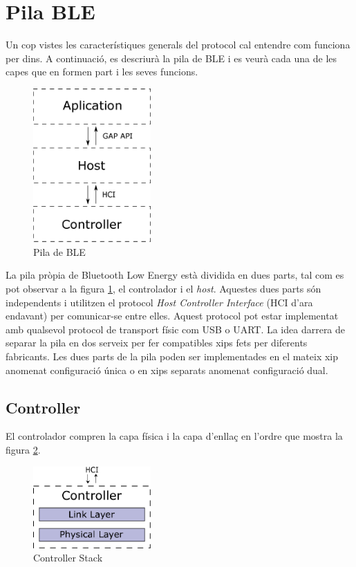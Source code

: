 \section{Pila BLE}
Un cop vistes les característiques generals del protocol cal entendre com funciona per dins.
A continuació, es descriurà la pila de BLE i es veurà cada una de les capes que en formen part i les seves funcions.

\begin{figure}[h!]
	\begin{center}
		\includegraphics[width=0.4\textwidth]{./diagrames/BLE_Stack_Simplified}
		\caption{Pila de BLE}
		\label{ble_stack}
	\end{center}
\end{figure}

La pila pròpia de Bluetooth Low Energy està dividida en dues parts, tal com es pot observar a la figura \ref{ble_stack}, el controlador i el \textit{host}. Aquestes dues parts són independents i utilitzen el protocol \textit{Host Controller Interface} (HCI d'ara endavant) per comunicar-se entre elles.
Aquest protocol pot estar implementat amb qualsevol protocol de transport físic com USB o UART.
La idea darrera de separar la pila en dos serveix per fer compatibles xips fets per diferents fabricants.
Les dues parts de la pila poden ser implementades en el mateix xip anomenat configuració única o en xips separats anomenat configuració dual.


\subsection{Controller}
El controlador compren la capa física i la capa d'enllaç en l'ordre que mostra la figura \ref{controller_stack}.

\begin{figure}[h!]
	\begin{center}
		\includegraphics[width=0.4\textwidth]{./diagrames/BLE_Controller}
		\caption{Controller Stack}
		\label{controller_stack}
	\end{center}
\end{figure}


